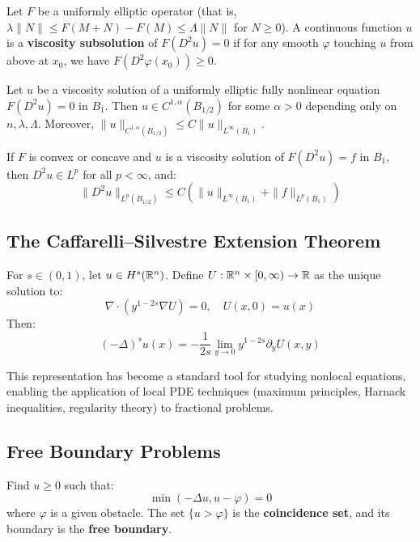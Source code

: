 \begin{definition}
Let $F$ be a uniformly elliptic operator (that is, $\lambda \|N\| \leq F(M+N) - F(M) \leq \Lambda \|N\|$ for $N \geq 0$). A continuous function $u$ is a \textbf{viscosity subsolution} of $F(D^2 u) = 0$ if for any smooth $\varphi$ touching $u$ from above at $x_0$, we have $F(D^2 \varphi(x_0)) \geq 0$.
\end{definition}

\begin{theorem}[Caffarelli, 1989]
Let $u$ be a viscosity solution of a uniformly elliptic fully nonlinear equation $F(D^2 u) = 0$ in $B_1$. Then $u \in C^{1,\alpha}(B_{1/2})$ for some $\alpha > 0$ depending only on $n, \lambda, \Lambda$. Moreover, $\|u\|_{C^{1,\alpha}(B_{1/2})} \leq C \|u\|_{L^\infty(B_1)}$.
\end{theorem}

\begin{theorem}
If $F$ is convex or concave and $u$ is a viscosity solution of $F(D^2 u) = f$ in $B_1$, then $D^2 u \in L^p$ for all $p < \infty$, and:
\[
\|D^2 u\|_{L^p(B_{1/2})} \leq C (\|u\|_{L^\infty(B_1)} + \|f\|_{L^p(B_1)})
\]
\end{theorem}

\subsection{The Caffarelli--Silvestre Extension Theorem}

\begin{theorem}
For $s \in (0,1)$, let $u \in H^s(\mathbb{R}^n)$. Define $U: \mathbb{R}^n \times [0,\infty) \to \mathbb{R}$ as the unique solution to:
\[
\nabla \cdot (y^{1-2s} \nabla U) = 0, \quad U(x,0) = u(x)
\]
Then:
\[
(-\Delta)^s u(x) = -\frac{1}{2s} \lim_{y\to 0} y^{1-2s} \partial_y U(x,y)
\]
\end{theorem}

This representation has become a standard tool for studying nonlocal equations, enabling the application of local PDE techniques (maximum principles, Harnack inequalities, regularity theory) to fractional problems.

\subsection{Free Boundary Problems}

\begin{definition}
Find $u \geq 0$ such that:
\[
\min(-\Delta u, u - \varphi) = 0
\]
where $\varphi$ is a given obstacle. The set $\{u > \varphi\}$ is the \textbf{coincidence set}, and its boundary is the \textbf{free boundary}.
\end{definition}

